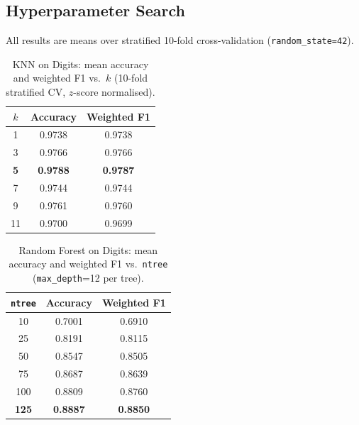 \documentclass[11pt,letterpaper]{article}
\begin{document}
\subsection{Hyperparameter Search}

All results are means over stratified 10-fold cross-validation
(\texttt{random\_state=42}).

\begin{table}[ht]
\centering
\caption{KNN on Digits: mean accuracy and weighted F1 vs.\ $k$
         (10-fold stratified CV, $z$-score normalised).}
\label{tab:d1_knn}
\begin{tabular}{@{}ccc@{}}
\toprule
$k$ & Accuracy & Weighted F1 \\
\midrule
1  & 0.9738 & 0.9738 \\
3  & 0.9766 & 0.9766 \\
\rowcolor{hilight}
\textbf{5}  & \textbf{0.9788} & \textbf{0.9787} \\
7  & 0.9744 & 0.9744 \\
9  & 0.9761 & 0.9760 \\
11 & 0.9700 & 0.9699 \\
\bottomrule
\end{tabular}
\end{table}

\begin{table}[ht]
\centering
\caption{Random Forest on Digits: mean accuracy and weighted F1 vs.\
         \texttt{ntree} (\texttt{max\_depth}=12 per tree).}
\label{tab:d1_rf}
\begin{tabular}{@{}ccc@{}}
\toprule
\texttt{ntree} & Accuracy & Weighted F1 \\
\midrule
10  & 0.7001 & 0.6910 \\
25  & 0.8191 & 0.8115 \\
50  & 0.8547 & 0.8505 \\
75  & 0.8687 & 0.8639 \\
100 & 0.8809 & 0.8760 \\
\rowcolor{hilight}
\textbf{125} & \textbf{0.8887} & \textbf{0.8850} \\
\bottomrule
\end{tabular}
\end{table}
\end{document}
